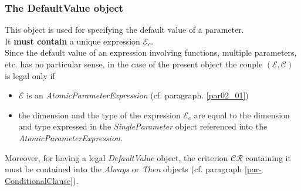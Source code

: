 \documentclass[a4paper,11pt] {article}
\begin{document}
\subsubsection{The DefaultValue object}\label{par-DefaultValue}
This object is used for specifying the default value of a parameter.\\
It {\bf must contain} a unique expression $\mathcal E_c$.\\
Since the default value of an expression involving functions, multiple parameters, etc. has no particular sense, in the case of the present object the couple $(\mathcal E, \mathcal C)$  is legal only if 
\begin{itemize}
\item $\mathcal E$ is an {\it AtomicParameterExpression} (cf. paragraph. \ref{par02_01})
\item the dimension and the type of the expression $\mathcal E_c$ are equal to the dimension and type expressed in the {\it SingleParameter} object referenced into the {\it AtomicParameterExpression}.
\end{itemize}
Moreover, for having a legal {\it DefaultValue} object, the criterion $\mathcal{CR}$ containing it must be contained into 
the {\it Always} or {\it Then}  objects (cf. paragraph \ref{par-ConditionalClause}).
\end{document}
